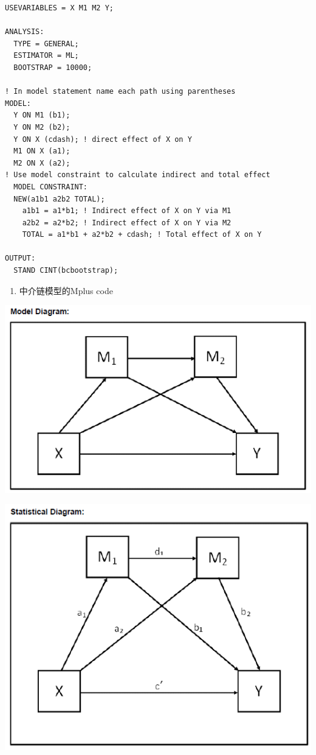 \documentclass[
]{book}
\providecommand{\tightlist}{%
  \setlength{\itemsep}{0pt}\setlength{\parskip}{0pt}}
\begin{document}
\begin{verbatim}
USEVARIABLES = X M1 M2 Y;

ANALYSIS:
  TYPE = GENERAL;
  ESTIMATOR = ML;
  BOOTSTRAP = 10000;

! In model statement name each path using parentheses
MODEL:
  Y ON M1 (b1);
  Y ON M2 (b2);
  Y ON X (cdash); ! direct effect of X on Y
  M1 ON X (a1);
  M2 ON X (a2);
! Use model constraint to calculate indirect and total effect
  MODEL CONSTRAINT:
  NEW(a1b1 a2b2 TOTAL);
    a1b1 = a1*b1; ! Indirect effect of X on Y via M1
    a2b2 = a2*b2; ! Indirect effect of X on Y via M2
    TOTAL = a1*b1 + a2*b2 + cdash; ! Total effect of X on Y

OUTPUT:
  STAND CINT(bcbootstrap);
\end{verbatim}

\begin{enumerate}
\def\labelenumi{\arabic{enumi}.}
\setcounter{enumi}{2}
\tightlist
\item
  中介链模型的Mplus code
\end{enumerate}

\includegraphics{figs/1135.png}

\includegraphics{figs/1136.png}
\end{document}
